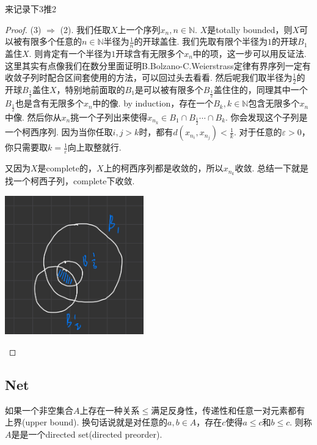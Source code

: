 来记录下3推2
\begin{proof}
(3) $\Rightarrow$ (2). 我们任取$X$上一个序列$x_n,n\in \mathbb{N}$. $X$是totally bounded，则$X$可以被有限多个任意的$n \in \mathbb{N}$半径为$\frac{1}{n}$的开球盖住. 我们先取有限个半径为$1$的开球$B_1$盖住$X$. 则肯定有一个半径为$1$开球含有无限多个$x_n$中的项，这一步可以用反证法. 这里其实有点像我们在数分里面证明B.Bolzano-C.Weierstrass定律有界序列一定有收敛子列时配合区间套使用的方法，可以回过头去看看. 然后呢我们取半径为$\frac{1}{2}$的开球$B_\frac{1}{2}$盖住$X$，特别地前面取的$B_1$是可以被有限多个$B_\frac{1}{2}$盖住住的，同理其中一个$B_\frac{1}{2}$也是含有无限多个$x_n$中的像. by induction，存在一个$B_k,k \in \mathbb{N}$包含无限多个$x_n$中像. 然后你从$x_n$挑一个子列出来使得$x_{n_k} \in B_1 \cap B_\frac{1}{2} \cdots \cap B_k$. 你会发现这个子列是一个柯西序列. 因为当你任取$i,j > k$时，都有$d(x_{n_i},x_{n_j}) < \frac{1}{k}$. 对于任意的$\varepsilon > 0$，你只需要取$k = \frac{1}{\varepsilon}$向上取整就行.

又因为$X$是complete的，$X$上的柯西序列都是收敛的，所以$x_{n_k}$收敛.{\color{red} 总结一下就是找一个柯西子列，complete下收敛}.

\begin{center}
\includegraphics[width=6cm, height=6cm]{images/complete_totally_bounded_to_sequentially_compact.jpg}
\end{center}
\end{proof}


\newpage
\subsection{Net}
\begin{definition}
\rm 如果一个非空集合$A$上存在一种关系$\leq$满足反身性，传递性和任意一对元素都有上界(upper bound). 换句话说就是对任意的$a,b \in A$，存在$c$使得$a \leq c$和$b \leq c$. 则称$A$是是一个directed set(directed preorder).
\end{definition}

